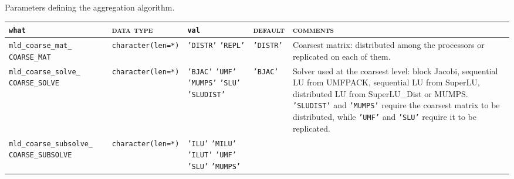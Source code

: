 \caption{Parameters defining the aggregation algorithm.
\label{tab:p_aggregation_1}} 
\esideways
                     
\bsideways
\begin{center}
\begin{tabular}{|p{3.5cm}|l|p{3.2cm}|l|p{5cm}|}
\hline
\verb|what|              & \textsc{data type}        &  \verb|val|      &  \textsc{default}  &
\textsc{comments} \\ \hline
\verb|mld_coarse_mat_|  \break \verb|COARSE_MAT|  & \verb|character(len=*)|
                         & \texttt{'DISTR'} \hspace{2.5cm} \texttt{'REPL'}
                         & \texttt{'DISTR'}
                         & Coarsest matrix: distributed among the processors or
                           replicated on each of them. \\ \hline
\verb|mld_coarse_solve_| \break \verb|COARSE_SOLVE| & \verb|character(len=*)|
                         & \texttt{'BJAC'} \hspace{2.5cm} 
                           \texttt{'UMF'} \hspace{2.5cm} \texttt{'MUMPS'} \hspace{2.5cm}
                           \texttt{'SLU'} \hspace{2.5cm} \texttt{'SLUDIST'}
                         & \texttt{'BJAC'}
                         & Solver used at the coarsest level: block Jacobi, sequential
                           LU from UMFPACK, sequential LU from SuperLU, 
                           distributed LU from SuperLU\_Dist or MUMPS.
                           \texttt{'SLUDIST'} and \texttt{'MUMPS'}
                           require the coarsest  matrix to be distributed, while
                           \texttt{'UMF'} and  \texttt{'SLU'} require
                           it to be replicated. \\ \hline 
\verb|mld_coarse_subsolve_| \break \verb|COARSE_SUBSOLVE| & \verb|character(len=*)|
                         & \texttt{'ILU'} \hspace{2.5cm} \texttt{'MILU'}
                           \hspace{2.5cm} \texttt{'ILUT'}
                           \hspace{2.5cm} \texttt{'UMF'}
                           \hspace{2.5cm} \texttt{'SLU'}
                           \hspace{2.5cm} \texttt{'MUMPS'}

\end{tabular}
\end{center}
